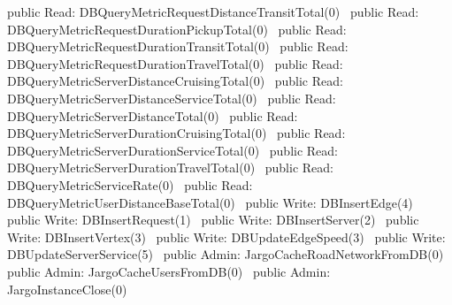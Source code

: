 public \LA{}Read: DBQueryMetricRequestDistanceTransitTotal(0)~{\nwtagstyle{}}\RA{}
public \LA{}Read: DBQueryMetricRequestDurationPickupTotal(0)~{\nwtagstyle{}}\RA{}
public \LA{}Read: DBQueryMetricRequestDurationTransitTotal(0)~{\nwtagstyle{}}\RA{}
public \LA{}Read: DBQueryMetricRequestDurationTravelTotal(0)~{\nwtagstyle{}}\RA{}
public \LA{}Read: DBQueryMetricServerDistanceCruisingTotal(0)~{\nwtagstyle{}}\RA{}
public \LA{}Read: DBQueryMetricServerDistanceServiceTotal(0)~{\nwtagstyle{}}\RA{}
public \LA{}Read: DBQueryMetricServerDistanceTotal(0)~{\nwtagstyle{}}\RA{}
public \LA{}Read: DBQueryMetricServerDurationCruisingTotal(0)~{\nwtagstyle{}}\RA{}
public \LA{}Read: DBQueryMetricServerDurationServiceTotal(0)~{\nwtagstyle{}}\RA{}
public \LA{}Read: DBQueryMetricServerDurationTravelTotal(0)~{\nwtagstyle{}}\RA{}
public \LA{}Read: DBQueryMetricServiceRate(0)~{\nwtagstyle{}}\RA{}
public \LA{}Read: DBQueryMetricUserDistanceBaseTotal(0)~{\nwtagstyle{}}\RA{}
\nwendcode{}\nwdocspar
{}
\nwenddocs{}\plusendmoddef
public \LA{}Write: DBInsertEdge(4)~{\nwtagstyle{}}\RA{}
public \LA{}Write: DBInsertRequest(1)~{\nwtagstyle{}}\RA{}
public \LA{}Write: DBInsertServer(2)~{\nwtagstyle{}}\RA{}
public \LA{}Write: DBInsertVertex(3)~{\nwtagstyle{}}\RA{}
public \LA{}Write: DBUpdateEdgeSpeed(3)~{\nwtagstyle{}}\RA{}
public \LA{}Write: DBUpdateServerService(5)~{\nwtagstyle{}}\RA{}
\nwendcode{}\nwdocspar
{}
\nwenddocs{}\plusendmoddef
public \LA{}Admin: JargoCacheRoadNetworkFromDB(0)~{\nwtagstyle{}}\RA{}
public \LA{}Admin: JargoCacheUsersFromDB(0)~{\nwtagstyle{}}\RA{}
public \LA{}Admin: JargoInstanceClose(0)~{\nwtagstyle{}}\RA{}
